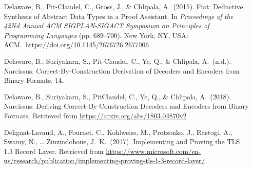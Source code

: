 \documentclass[12pt,twoside]{article}
\begin{document}
{\begin{thebibliography}{222}
Delaware, B., Pit-Claudel, C., Gross, J., \& Chlipala, A.~(2015). Fiat: Deductive Synthesis of Abstract Data Types in a Proof Assistant. In \emph{Proceedings of the 42Nd Annual ACM SIGPLAN-SIGACT Symposium on Principles of Programming Languages} (pp. 689–700). New York, NY, USA: ACM.~https://doi.org/\href{https://dx.doi.org/10.1145/2676726.2677006}{10.1145/2676726.2677006}\label{delaware_fiat:_2015}%

Delaware, B., Suriyakarn, S., Pit-Claudel, C., Ye, Q., \& Chlipala, A.~(n.d.). Narcissus: Correct-By-Construction Derivation of Decoders and Encoders from Binary Formats, 14.\label{delaware_narcissus:_nodate}%

Delaware, B., Suriyakarn, S., Pit\textendash{}Claudel, C., Ye, Q., \& Chlipala, A.~(2018). Narcissus: Deriving Correct-By-Construction Decoders and Encoders from Binary Formats. Retrieved from \href{https://arxiv.org/abs/1803.04870v2}{{\ttfamily https://\hspace{0pt}arxiv.\hspace{0pt}org/\hspace{0pt}abs/\hspace{0pt}1803.\hspace{0pt}04870v2}}\label{delaware_narcissus:_2018}%

Delignat-Lavaud, A., Fournet, C., Kohlweiss, M., Protzenko, J., Rastogi, A., Swamy, N., … Zinzindohoue, J.~K.~(2017). Implementing and Proving the TLS 1.3 Record Layer. Retrieved from \href{https://www.microsoft.com/en-us/research/publication/implementing-proving-tls-1-3-record-layer/}{{\ttfamily https://\hspace{0pt}www.\hspace{0pt}microsoft.\hspace{0pt}com/\hspace{0pt}en-\hspace{0pt}us/\hspace{0pt}research/\hspace{0pt}publication/\hspace{0pt}implementing-\hspace{0pt}proving-\hspace{0pt}tls-\hspace{0pt}1-\hspace{0pt}3-\hspace{0pt}record-\hspace{0pt}layer/\hspace{0pt}}}\label{delignat-lavaud_implementing_2017}%


\end{thebibliography}}
\end{document}
